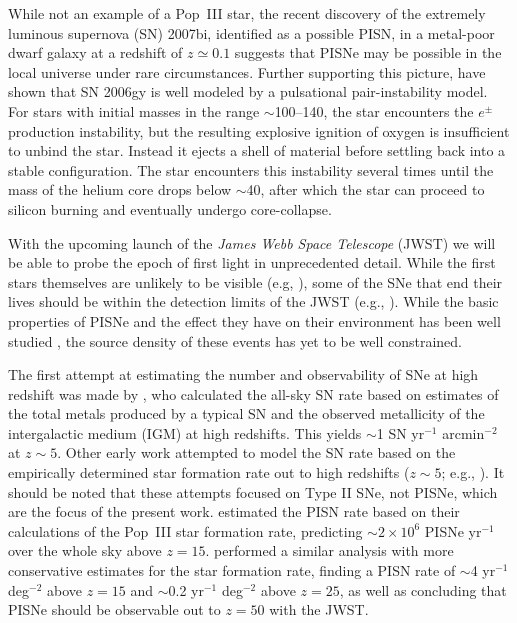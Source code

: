 \documentclass[../thesis.tex]{subfiles}
\begin{document}
While not an example of a Pop~III star, the recent discovery of the
extremely luminous supernova (SN) 2007bi, identified as a possible
PISN, in a metal-poor dwarf galaxy at a redshift of $z\simeq0.1$
\citep{Gal-Yametal2009} suggests that PISNe may be possible in the
local universe under rare circumstances. Further supporting this
picture, \citet{WoosleyBlinnikovHeger2007} have shown that SN 2006gy
\citep{Smithetal2007} is well modeled by a pulsational
pair-instability model. For stars with initial masses in the range
$\sim$100--140\msun, the star encounters the $e^{\pm}$ production
instability, but the resulting explosive ignition of oxygen is
insufficient to unbind the star.  Instead it ejects a shell of
material before settling back into a stable configuration.  The star
encounters this instability several times until the mass of the helium
core drops below $\sim$40\msun, after which the star can proceed to
silicon burning and eventually undergo core-collapse.

With the upcoming launch of the \textit{James Webb Space Telescope}
(JWST) we will be able to probe the epoch of first light in
unprecedented detail.  While the first stars themselves are unlikely
to be visible (e.g, \citealt{BrommKudritzkiLoeb2001,
  PawlikMilosavljevicBromm2011}), some of the SNe that end their lives
should be within the detection limits of the JWST (e.g.,
\citealt{MackeyBrommHernquist2003, Scannapiecoetal2005,
  Gardneretal2006}). While the basic properties of PISNe and the
effect they have on their environment has been well studied
\citep{MoriFerraraMadau2002, BrommYoshidaHernquist2003,
  FurlanettoLoeb2003, KitayamaYoshida2005, Whalenetal2008,
  WiseAbel2008, Greifetal2010}, the source density of these events has
yet to be well constrained.

The first attempt at estimating the number and observability of SNe at
high redshift was made by \citet{Miralda-EscudeRees1997}, who
calculated the all-sky SN rate based on estimates of the total metals
produced by a typical SN and the observed metallicity of the
intergalactic medium (IGM) at high redshifts.  This yields $\sim$1 SN
yr$^{-1}$ arcmin$^{-2}$ at $z \sim 5$. Other early work attempted to
model the SN rate based on the empirically determined star formation
rate out to high redshifts ($z \sim 5$; e.g.,
\citealt{MadauDellaVallePanagia1998, DahlenFransson1999}).  It should
be noted that these attempts focused on Type II SNe, not PISNe, which
are the focus of the present work. \citet{MackeyBrommHernquist2003}
estimated the PISN rate based on their calculations of the Pop~III
star formation rate, predicting $\sim$$2\times10^6$ PISNe yr$^{-1}$
over the whole sky above $z=15$.  \citet{WeinmannLilly2005} performed
a similar analysis with more conservative estimates for the star
formation rate, finding a PISN rate of $\sim$4 yr$^{-1}$ deg$^{-2}$
above $z=15$ and $\sim$0.2 yr$^{-1}$ deg$^{-2}$ above $z=25$, as well
as concluding that PISNe should be observable out to $z=50$ with the
JWST.
\end{document}
